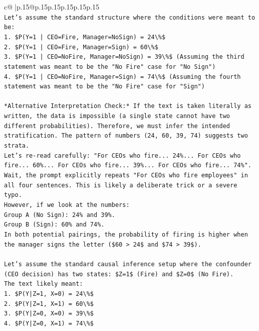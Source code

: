 \documentclass{article}
\begin{document}
{\begin{supertabular}{c@{$\;$}|p{.15\linewidth}@{}p{.15\linewidth}p{.15\linewidth}p{.15\linewidth}p{.15\linewidth}p{.15\linewidth}}
{{{\\ 
\texttt{Let's assume the standard structure where the conditions were meant to be:} \\
\texttt{1.  \$P(Y=1 | CEO=Fire, Manager=NoSign) = 24\textbackslash{}\%\$} \\
\texttt{2.  \$P(Y=1 | CEO=Fire, Manager=Sign) = 60\textbackslash{}\%\$} \\
\texttt{3.  \$P(Y=1 | CEO=NoFire, Manager=NoSign) = 39\textbackslash{}\%\$ (Assuming the third statement was meant to be the "No Fire" case for "No Sign")} \\
\texttt{4.  \$P(Y=1 | CEO=NoFire, Manager=Sign) = 74\textbackslash{}\%\$ (Assuming the fourth statement was meant to be the "No Fire" case for "Sign")} \\
\\ 
\texttt{*Alternative Interpretation Check:* If the text is taken literally as written, the data is impossible (a single state cannot have two different probabilities). Therefore, we must infer the intended stratification. The pattern of numbers (24, 60, 39, 74) suggests two strata.} \\
\texttt{Let's re{-}read carefully: "For CEOs who fire... 24\%... For CEOs who fire... 60\%... For CEOs who fire... 39\%... For CEOs who fire... 74\%".} \\
\texttt{Wait, the prompt explicitly repeats "For CEOs who fire employees" in all four sentences. This is likely a deliberate trick or a severe typo.} \\
\texttt{However, if we look at the numbers:} \\
\texttt{Group A (No Sign): 24\% and 39\%.} \\
\texttt{Group B (Sign): 60\% and 74\%.} \\
\texttt{In both potential pairings, the probability of firing is higher when the manager signs the letter (\$60 > 24\$ and \$74 > 39\$).} \\
\\ 
\texttt{Let's assume the standard causal inference setup where the confounder (CEO decision) has two states: \$Z=1\$ (Fire) and \$Z=0\$ (No Fire).} \\
\texttt{The text likely meant:} \\
\texttt{1.  \$P(Y|Z=1, X=0) = 24\textbackslash{}\%\$} \\
\texttt{2.  \$P(Y|Z=1, X=1) = 60\textbackslash{}\%\$} \\
\texttt{3.  \$P(Y|Z=0, X=0) = 39\textbackslash{}\%\$} \\
\texttt{4.  \$P(Y|Z=0, X=1) = 74\textbackslash{}\%\$} \\
}}}
\end{supertabular}}
\end{document}
